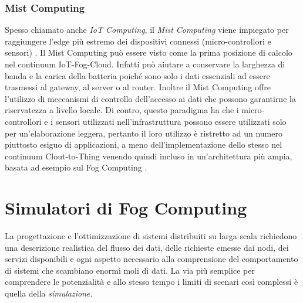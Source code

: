 
\subsubsection{Mist Computing}

Spesso chiamato anche \textit{IoT Computing}, il \textit{Mist Computing} viene impiegato per raggiungere l'edge più estremo dei dispositivi connessi (micro-controllori e sensori) \cite{MistComputing}. Il Mist Computing può essere visto come la prima posizione di calcolo nel continuum IoT-Fog-Cloud. Infatti può aiutare a conservare la larghezza di banda e la carica della batteria poiché sono solo i dati essenziali ad essere trasmessi al gateway, al server o al router. Inoltre il Mist Computing offre l'utilizzo di meccanismi di controllo dell'accesso ai dati che possono garantirne la riservatezza a livello locale. Di contro, questo paradigma ha che i micro-controllori e i sensori utilizzati nell'infrastruttura possono essere utilizzati solo per un'elaborazione leggera, pertanto il loro utilizzo è ristretto ad un numero piuttosto esiguo di applicazioni, a meno dell'implementazione dello stesso nel continuum Clout-to-Thing venendo quindi incluso in un'architettura più ampia, basata ad esempio sul Fog Computing \cite{MistComputingFutureDirections}.

\section{Simulatori di Fog Computing}

La progettazione e l'ottimizzazione di sistemi distribuiti su larga scala richiedono una descrizione realistica del flusso dei dati, delle richieste emesse dai nodi, dei servizi disponibili e ogni aspetto necessario alla comprensione del comportamento di sistemi che scambiano enormi moli di dati. La via più semplice per comprendere le potenzialità e allo stesso tempo i limiti di scenari così complessi è quella della \textit{simulazione}.

